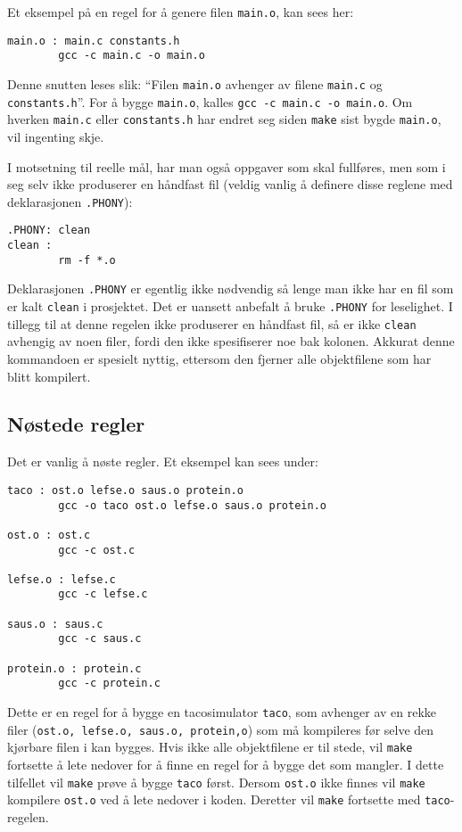 \begin{alphasection}
Et eksempel på en regel for å genere filen \verb|main.o|, kan sees her:

\begin{lstlisting}
main.o : main.c constants.h
        gcc -c main.c -o main.o
\end{lstlisting}

Denne snutten leses slik: ``Filen \verb|main.o| avhenger av filene \verb|main.c| og \verb|constants.h|''. For å bygge  \verb|main.o|, kalles \verb|gcc -c main.c -o main.o|. Om hverken \verb|main.c| eller \verb|constants.h| har endret seg siden \verb|make| sist bygde \verb|main.o|, vil ingenting skje.

I motsetning til reelle mål, har man også oppgaver som skal fullføres, men som i seg selv ikke produserer en håndfast fil (veldig vanlig å definere disse reglene med deklarasjonen \verb|.PHONY|):
\\
\begin{verbatim}
.PHONY: clean
clean :
        rm -f *.o
\end{verbatim}


Deklarasjonen \verb|.PHONY| er egentlig ikke nødvendig så lenge man ikke har en fil som er kalt \verb|clean| i prosjektet. Det er uansett anbefalt å bruke \verb|.PHONY| for leselighet. I tillegg til at denne regelen ikke produserer en håndfast fil, så er ikke \verb|clean| avhengig av noen filer, fordi den ikke spesifiserer noe bak kolonen. Akkurat denne kommandoen er spesielt nyttig, ettersom den fjerner alle objektfilene som har blitt kompilert. 

\subsection{Nøstede regler}

Det er vanlig å nøste regler. Et eksempel kan sees under:

\begin{lstlisting}
taco : ost.o lefse.o saus.o protein.o
        gcc -o taco ost.o lefse.o saus.o protein.o

ost.o : ost.c
        gcc -c ost.c

lefse.o : lefse.c
        gcc -c lefse.c

saus.o : saus.c
        gcc -c saus.c

protein.o : protein.c
        gcc -c protein.c
\end{lstlisting}

Dette er en regel for å bygge en tacosimulator \verb|taco|, som avhenger av en rekke filer (\verb|ost.o, lefse.o, saus.o, protein,o|) som må kompileres før selve den kjørbare filen i kan bygges. Hvis ikke alle objektfilene er til stede, vil \verb|make| fortsette å lete nedover for å finne en regel for å bygge det som mangler. I dette tilfellet vil \verb|make| prøve å bygge \verb|taco| først. Dersom \verb|ost.o| ikke finnes vil \verb|make| kompilere \verb|ost.o| ved å lete nedover i koden. Deretter vil \verb|make| fortsette med \verb|taco|-regelen.


\end{alphasection}
